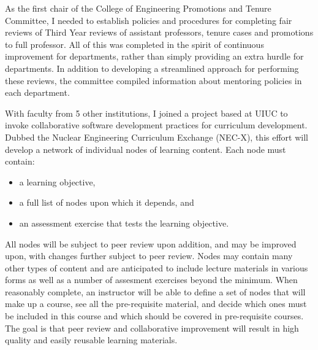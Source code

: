 As the first chair of the College of Engineering Promotions and Tenure
Committee, I needed to establish policies and procedures for completing fair
reviews of Third Year reviews of assistant professors, tenure cases and
promotions to full professor.  All of this was completed in the spirit of
continuous improvement for departments, rather than simply providing an extra
hurdle for departments.  In addition to developing a streamlined approach for
performing these reviews, the committee compiled information about mentoring
policies in each department.

With faculty from 5 other institutions, I joined a project based at UIUC to
invoke collaborative software development practices for curriculum
development.  Dubbed the Nuclear Engineering Curriculum Exchange (NEC-X), this
effort will develop a network of individual nodes of learning content.  Each
node must contain:
\begin{itemize}
\item a learning objective,
\item a full list of nodes upon which it depends, and
\item an assessment exercise that tests the learning objective.
\end{itemize}
All nodes will be subject to peer review upon addition, and may be improved
upon, with changes further subject to peer review.  Nodes may contain many
other types of content and are anticipated to include lecture materials in
various forms as well as a number of assesment exercises beyond the minimum.
When reasonably complete, an instructor will be able to define a set of nodes
that will make up a course, see all the pre-requisite material, and decide
which ones must be included in this course and which should be covered in
pre-requisite courses.  The goal is that peer review and collaborative
improvement will result in high quality and easily reusable learning
materials.
